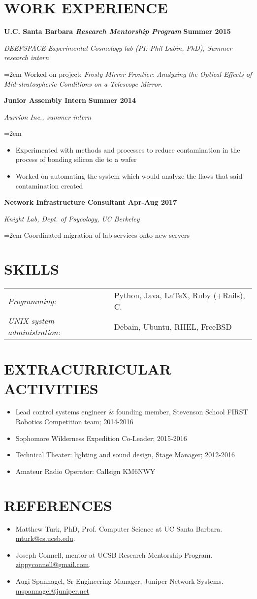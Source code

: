 \documentclass[paper=a4,fontsize=11pt]{scrartcl} %
\newcommand{\sepspace}{\vspace*{0.5em}}		%
\newcommand{\NewPart}[1]{\section*{\uppercase{#1}}}
\newcommand{\EducationEntry}[4]{
		\noindent \textbf{#1} \hfill      %
		\colorbox{White}{%
			\parbox{6.5em}{%
			\hfill\color{Black}\textbf{#2}}} \par  %
		\noindent \textit{#3} \par        %
		\noindent\hangindent=2em\hangafter=0 \small #4 %
		\normalsize \par}
\newcommand{\WorkEntry}[4]{				  %
		\noindent \textbf{#1} \hfill      %
		\colorbox{White}{\color{Black}\textbf{#2}} \par  %
		\noindent \textit{#3} \par              %
		\noindent\hangindent=2em\hangafter=0 \small #4 %
		\normalsize \par}
\begin{document}
\label{WORK}

\NewPart{Work experience}{}

\WorkEntry{U.C. Santa Barbara \textit{Research Mentorship Program}}{Summer 2015}{DEEPSPACE Experimental Cosmology lab (PI: Phil Lubin, PhD), Summer research intern}{Worked on project: \textit{Frosty Mirror Frontier: Analyzing the Optical Effects of Mid-stratospheric Conditions on a Telescope Mirror}.}
\sepspace

\WorkEntry{Junior Assembly Intern}{Summer 2014}{Aurrion Inc., summer intern}{\begin{itemize}\setlength\itemsep{0em}
		\item Experimented with methods and processes to reduce contamination in the process of bonding silicon die to a wafer
		\item Worked on automating the system which would analyze the flaws that said contamination created	\end{itemize} }
	
\WorkEntry{Network Infrastructure Consultant}{Apr-Aug 2017}{Knight Lab, Dept. of Psycology, UC Berkeley}{Coordinated migration of lab services onto new servers}

\vspace{-1em}

\label{SKILLS}
\NewPart{Skills}{}
\begin{tabular}{ll}
\textit{Programming:} & Python, Java, \LaTeX, Ruby (+Rails), C.\\
\textit{UNIX system administration:} & Debain, Ubuntu, RHEL, FreeBSD\\
\end{tabular}
\vspace{-1em}
\label{EXTRACUR}
\NewPart{Extracurricular Activities}{}
\begin{itemize}\setlength\itemsep{-.5em}
	\item Lead control systems engineer \& founding member, Stevenson School FIRST Robotics Competition team; 2014-2016
	\item Sophomore Wilderness Expedition Co-Leader; 2015-2016
	\item Technical Theater: lighting and sound design, Stage Manager; 2012-2016
	\item Amateur Radio Operator: Callsign KM6NWY
\end{itemize}
\vspace{-2em}
\label{REFERENCES}
\NewPart{References}{}
\begin{itemize}\setlength\itemsep{-.5em}
	\item Matthew Turk, PhD, Prof. Computer Science at UC Santa Barbara. \url{mturk@cs.ucsb.edu}.
	\item Joseph Connell, mentor at UCSB Research Mentorship Program. \url{zippyconnell@gmail.com}.
	\item Augi Spannagel, Sr Engineering Manager, Juniper Network Systems. \url{mspannagel@juniper.net}
\end{itemize}
\end{document}
